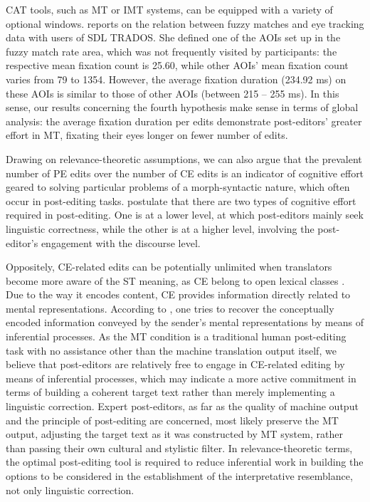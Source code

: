 \documentclass[output=paper]{langsci/langscibook}
\begin{document}
CAT tools, such as MT or IMT systems, can be equipped with a variety of optional windows. \citet{obrien2008} reports on the relation between fuzzy matches and eye tracking data with users of SDL TRADOS. She defined one of the AOIs set up in the fuzzy match rate area, which was not frequently visited by participants: the respective mean fixation count is 25.60, while other AOIs' mean fixation count varies from 79 to 1354. However, the average fixation duration (234.92 ms) on these AOIs is similar to those of other AOIs (between 215 -- 255 ms). In this sense, our results concerning the fourth hypothesis make sense in terms of global analysis: the average fixation duration per edits demonstrate post-editors' greater effort in MT, fixating their eyes longer on fewer number of edits. 



Drawing on relevance-theoretic assumptions, we can also argue that the prevalent number of PE edits over the number of CE edits is an indicator of cognitive effort geared to solving particular problems of a morph-syntactic nature, which often occur in post-editing tasks. \citet{krings2001} postulate that there are two types of cognitive effort required in post-editing. One is at a lower level, at which post-editors mainly seek linguistic correctness, while the other is at a higher level, involving the post-editor's engagement with the discourse level.  



Oppositely, CE-related edits can be potentially unlimited when translators become more aware of the ST meaning, as CE belong to open lexical classes \citep{moeschler1998}. Due to the way it encodes content, CE provides information directly related to mental representations. According to \citet{alves2001}, one tries to recover the conceptually encoded information conveyed by the sender's mental representations by means of inferential processes. As the MT condition is a traditional human post-editing task with no assistance other than the machine translation output itself, we believe that post-editors are relatively free to engage in CE-related editing by means of inferential processes, which may indicate a more active commitment in terms of building a coherent target text rather than merely implementing a linguistic correction. Expert post-editors, as far as the quality of machine output and the principle of post-editing are concerned, most likely preserve the MT output, adjusting the target text as it was constructed by MT system, rather than passing their own cultural and stylistic filter. In relevance-theoretic terms, the optimal post-editing tool is required to reduce inferential work in building the options to be considered in the establishment of the interpretative resemblance, not only linguistic correction. 
\end{document}

